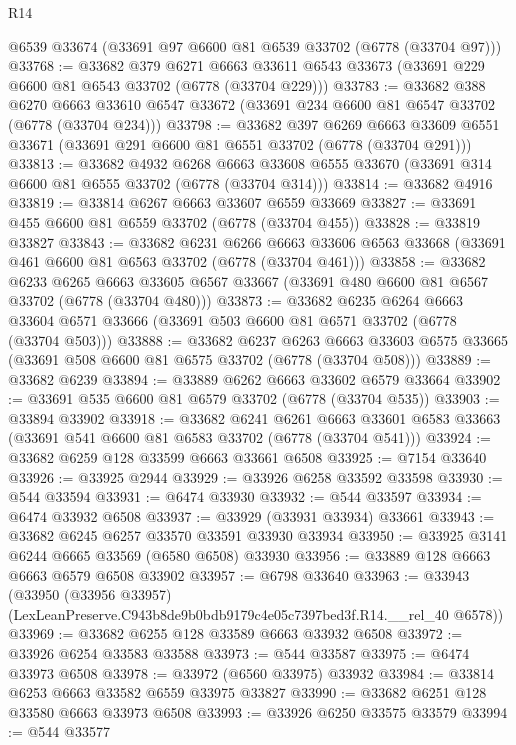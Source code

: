 \begin{lexlean}{R14}
\begin{coremodule}
    @6539
    @33674
    (@33691 @97 @6600 @81 @6539 @33702 (@6778 (@33704 @97)))
@33768 := @33682
    @379
    @6271
    @6663
    @33611
    @6543
    @33673
    (@33691 @229 @6600 @81 @6543 @33702 (@6778 (@33704 @229)))
@33783 := @33682
    @388
    @6270
    @6663
    @33610
    @6547
    @33672
    (@33691 @234 @6600 @81 @6547 @33702 (@6778 (@33704 @234)))
@33798 := @33682
    @397
    @6269
    @6663
    @33609
    @6551
    @33671
    (@33691 @291 @6600 @81 @6551 @33702 (@6778 (@33704 @291)))
@33813 := @33682
    @4932
    @6268
    @6663
    @33608
    @6555
    @33670
    (@33691 @314 @6600 @81 @6555 @33702 (@6778 (@33704 @314)))
@33814 := @33682 @4916
@33819 := @33814 @6267 @6663 @33607 @6559 @33669
@33827 := @33691 @455 @6600 @81 @6559 @33702 (@6778 (@33704 @455))
@33828 := @33819 @33827
@33843 := @33682
    @6231
    @6266
    @6663
    @33606
    @6563
    @33668
    (@33691 @461 @6600 @81 @6563 @33702 (@6778 (@33704 @461)))
@33858 := @33682
    @6233
    @6265
    @6663
    @33605
    @6567
    @33667
    (@33691 @480 @6600 @81 @6567 @33702 (@6778 (@33704 @480)))
@33873 := @33682
    @6235
    @6264
    @6663
    @33604
    @6571
    @33666
    (@33691 @503 @6600 @81 @6571 @33702 (@6778 (@33704 @503)))
@33888 := @33682
    @6237
    @6263
    @6663
    @33603
    @6575
    @33665
    (@33691 @508 @6600 @81 @6575 @33702 (@6778 (@33704 @508)))
@33889 := @33682 @6239
@33894 := @33889 @6262 @6663 @33602 @6579 @33664
@33902 := @33691 @535 @6600 @81 @6579 @33702 (@6778 (@33704 @535))
@33903 := @33894 @33902
@33918 := @33682
    @6241
    @6261
    @6663
    @33601
    @6583
    @33663
    (@33691 @541 @6600 @81 @6583 @33702 (@6778 (@33704 @541)))
@33924 := @33682 @6259 @128 @33599 @6663 @33661 @6508
@33925 := @7154 @33640
@33926 := @33925 @2944
@33929 := @33926 @6258 @33592 @33598
@33930 := @544 @33594
@33931 := @6474 @33930
@33932 := @544 @33597
@33934 := @6474 @33932 @6508
@33937 := @33929 (@33931 @33934) @33661
@33943 := @33682 @6245 @6257 @33570 @33591 @33930 @33934
@33950 := @33925 @3141 @6244 @6665 @33569 (@6580 @6508) @33930
@33956 := @33889 @128 @6663 @6663 @6579 @6508 @33902
@33957 := @6798 @33640
@33963 := @33943
    (@33950 (@33956 @33957) (LexLeanPreserve.C943b8de9b0bdb9179c4e05c7397bed3f.R14.__rel_40 @6578))
@33969 := @33682 @6255 @128 @33589 @6663 @33932 @6508
@33972 := @33926 @6254 @33583 @33588
@33973 := @544 @33587
@33975 := @6474 @33973 @6508
@33978 := @33972 (@6560 @33975) @33932
@33984 := @33814 @6253 @6663 @33582 @6559 @33975 @33827
@33990 := @33682 @6251 @128 @33580 @6663 @33973 @6508
@33993 := @33926 @6250 @33575 @33579
@33994 := @544 @33577

\end{coremodule}
\end{lexlean}
